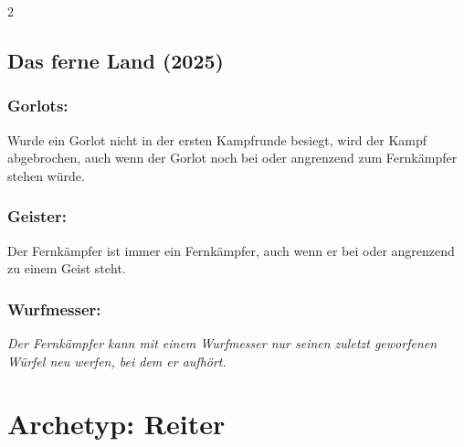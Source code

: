 \documentclass[10pt, a4paper, oneside]{book}
\newcommand{\fan}[1]{\textit{#1}}
\begin{document}
\begin{multicols*}{2}
\begin{bgcolor}
\section{Das ferne Land (2025)}


\subsection{Gorlots:}

Wurde ein Gorlot nicht in der ersten Kampfrunde besiegt, wird der Kampf abgebrochen, auch wenn der Gorlot noch bei oder angrenzend zum Fernkämpfer stehen würde.
\supercite{127533}





\subsection{Geister:}

Der Fernkämpfer ist immer ein Fernkämpfer, auch wenn er bei oder angrenzend zu einem Geist steht.
\supercite{dfl-begleitheft,dfl3-g}



\subsection{Wurfmesser:}

\fan{Der Fernkämpfer kann mit einem Wurfmesser nur seinen zuletzt geworfenen Würfel neu werfen, bei dem er aufhört.}


\end{bgcolor}


\end{multicols*}











\chapter{Archetyp: Reiter}
\label{reiter}
\end{document}
